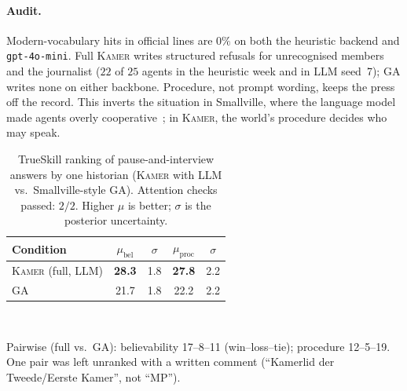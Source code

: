 \documentclass[sigconf,review,anonymous]{acmart}
\newcommand{\sys}{\textsc{Kamer}}
\begin{document}
\paragraph{Audit.} Modern-vocabulary hits in official lines are $0\%$ on
both the heuristic backend and \texttt{gpt-4o-mini}. Full \sys{} writes
structured refusals for unrecognised members and the journalist ($22$ of
$25$ agents in the heuristic week and in LLM seed~7); GA writes none on
either backbone. Procedure, not prompt wording, keeps the press off the
record. This inverts the situation in Smallville, where the language model
made agents overly cooperative~\cite{park2023generative}; in \sys{}, the
world's procedure decides who may speak.

\begin{table}[t]
\caption{TrueSkill ranking of pause-and-interview answers by one historian
(\sys{} with LLM vs.\ Smallville-style GA). Attention checks passed: $2/2$.
Higher $\mu$ is better; $\sigma$ is the posterior uncertainty.}
\label{tab:historian}
\centering\small
\setlength{\tabcolsep}{3.5pt}
\begin{tabular}{lcccc}
\toprule
Condition & $\mu_{\text{bel}}$ & $\sigma$ & $\mu_{\text{proc}}$ & $\sigma$ \\
\midrule
\sys{} (full, LLM) & \textbf{28.3} & 1.8 & \textbf{27.8} & 2.2 \\
GA~\cite{park2023generative} & 21.7 & 1.8 & 22.2 & 2.2 \\
\bottomrule
\end{tabular}\\[4pt]
{\raggedright\scriptsize Pairwise (full vs.\ GA): believability 17--8--11
(win--loss--tie); procedure 12--5--19. One pair was left unranked with a
written comment (``Kamerlid der Tweede/Eerste Kamer'', not ``MP'').\par}
\end{table}
\end{document}

